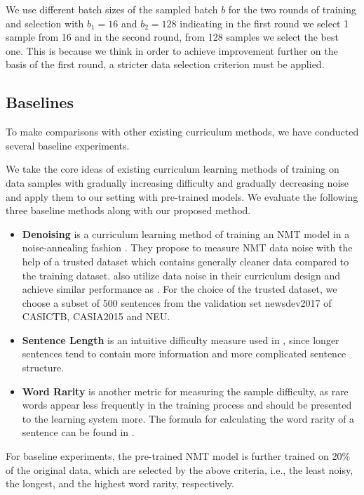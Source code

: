 \documentclass[letterpaper]{article}
\begin{document}
We use different batch sizes of the sampled batch $b$ for the two rounds of training and selection with $b_1=16$ and $b_2=128$ indicating in the first round we select 1 sample from 16 and in the second round, from 128 samples we select the best one. This is because we think in order to achieve improvement further on the basis of the first round, a stricter data selection criterion must be applied.

\subsection{Baselines}
To make comparisons with other existing curriculum methods, we have conducted several baseline experiments. 

We take the core ideas of existing curriculum learning methods of training on data samples with gradually increasing difficulty \cite{platanios2019competence} and gradually decreasing noise \cite{wang2018denoising} and apply them to our setting with pre-trained models. We evaluate the following three baseline methods along with our proposed method.

\begin{itemize}
	\item{\textbf{Denoising}} is a curriculum learning method of training an NMT model in a noise-annealing fashion \cite{wang2018denoising}. They propose to measure NMT data noise with the help of a trusted dataset which contains generally cleaner data compared to the training dataset. \cite{kumar2019reinforcement} also utilize data noise in their curriculum design and achieve similar performance as \cite{wang2018denoising}. For the choice of the trusted dataset, we choose a subset of 500 sentences from the validation set newsdev2017 of CASICTB, CASIA2015 and NEU.
	\item{\textbf{Sentence Length}} is an intuitive difficulty measure used in \cite{platanios2019competence}, since longer sentences tend to contain more information and more complicated sentence structure. 
	\item{\textbf{Word Rarity}} is another metric for measuring the sample difficulty, as rare words appear less frequently in the training process and should be presented to the learning system more. The formula for calculating the word rarity of a sentence can be found in \cite{platanios2019competence}.
\end{itemize}

For baseline experiments, the pre-trained NMT model is further trained on 20\% of the original data, which are selected by the above criteria, i.e., the least noisy, the longest, and the highest word rarity, respectively.
\end{document}

